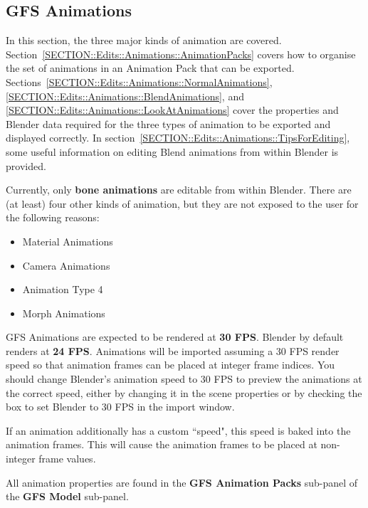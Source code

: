 \documentclass{article}
\begin{document}
\clearpage
\subsection{GFS Animations}
\label{SECTION::Editing::Animations}
In this section, the three major kinds of animation are covered. Section~\ref{SECTION::Edits::Animations::AnimationPacks} covers how to organise the set of animations in an Animation Pack that can be exported. Sections~\ref{SECTION::Edits::Animations::NormalAnimations}, \ref{SECTION::Edits::Animations::BlendAnimations}, and \ref{SECTION::Edits::Animations::LookAtAnimations} cover the properties and Blender data required for the three types of animation to be exported and displayed correctly. In section~\ref{SECTION::Edits::Animations::TipsForEditing}, some useful information on editing Blend animations from within Blender is provided.

Currently, only \textbf{bone animations} are editable from within Blender. There are (at least) four other kinds of animation, but they are not exposed to the user for the following reasons:
\begin{itemize}
\item {Material Animations}
\item {Camera Animations}
\item {Animation Type 4}
\item {Morph Animations}
\end{itemize}

GFS Animations are expected to be rendered at \textbf{30 FPS}. Blender by default renders at \textbf{24 FPS}. Animations will be imported assuming a 30 FPS render speed so that animation frames can be placed at integer frame indices. You should change Blender's animation speed to 30 FPS to preview the animations at the correct speed, either by changing it in the scene properties or by checking the box to set Blender to 30 FPS in the import window.

If an animation additionally has a custom ``speed", this speed is baked into the animation frames. This will cause the animation frames to be placed at non-integer frame values.

All animation properties are found in the \textbf{GFS Animation Packs} sub-panel of the \textbf{GFS Model} sub-panel.
\end{document}
